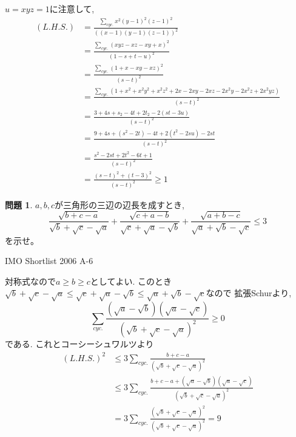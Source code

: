 \documentclass[uplatex, a5paper]{jsarticle}
\makeatletter
\theoremstyle{definition}
\newtheorem{prob}{問題}
\renewenvironment{proof}[1][\proofname]{
  \pushQED{\qed}%
  \normalfont \topsep6\p@\@plus6\p@\relax
  \trivlist
  \item[\hskip\labelsep
    #1\@addpunct{\textbf{.}}]\ignorespaces
}{%
  \popQED\endtrivlist\@endpefalse
}
\providecommand{\proofname}{証明}
\def\qed{\hfill $\Box$}
\makeatother
\begin{document}
\begin{proof}
  \(u=xyz=1\)に注意して,
  \begin{align*}
    ( L.H.S.) &=  \frac{ \sum_{cyc.}x^2(y-1)^2(z-1)^2 }{\left( (x-1)(y-1)(z-1) \right) ^2 }  \\
    &=  \frac{ \sum_{cyc.} (xyz - xz - xy + x ) ^2 }{(1-s+t-u)^2}  \\
    &=  \frac{ \sum_{cyc.} ( 1+x -xy-xz)^2}{(s-t)^2}  \\
    &=  \frac{ \sum_{cyc.} (1+x^2+x^2y^2+x^2z^2+2x-2xy-2xz-2x^2y-2x^2z+2x^2yz)}{(s-t)^2}  \\
    &=  \frac{ 3+4s + s_2 -4t + 2t_2-2(st-3u) }{(s-t)^2}  \\
    &=  \frac{ 9+4s+(s^2-2t)-4t+2(t^2-2su)-2st }{(s-t)^2}  \\
    &=  \frac{ s^2 -2st + 2t^2 -6t +1}{(s-t)^2}  \\
    &=  \frac{ (s-t)^2 + (t-3)^2}{(s-t)^2} \geq 1
  \end{align*}
\end{proof}









\newpage

\begin{prob}
  \(a,b,c\)が三角形の三辺の辺長を成すとき,
  \[
  \frac{\sqrt{b+c-a}}{\sqrt{b}+\sqrt{c}-\sqrt{a}} +
  \frac{\sqrt{c+a-b}}{\sqrt{c}+\sqrt{a}-\sqrt{b}} +
  \frac{\sqrt{a+b-c}}{\sqrt{a}+\sqrt{b}-\sqrt{c}}
  \leq 3
  \]
  を示せ。
  \begin{flushright}
    IMO Shortlist 2006 A-6
  \end{flushright}
\end{prob}


\begin{proof}
  対称式なので\(a \geq b \geq c\)としてよい.
  このとき\(\sqrt{b}+\sqrt{c}-\sqrt{a} \leq \sqrt{c}+\sqrt{a}-\sqrt{b} \leq \sqrt{a}+\sqrt{b}-\sqrt{c}\)なので
  拡張Schurより,
  \[
  \sum_{cyc.} \frac{(\sqrt{a} - \sqrt{b})(\sqrt{a}-\sqrt{c})}{(\sqrt{b}+\sqrt{c}-\sqrt{a})^2} \geq 0
  \]
  である. これとコーシーシュワルツより
  \begin{align*}
    (L.H.S.)^2 &\leq 3 \sum_{cyc.} \frac{b+c-a}{(\sqrt{b}+\sqrt{c}-\sqrt{a})^2}   \\
    &\leq 3 \sum_{cyc.} \frac{b+c-a + (\sqrt{a} - \sqrt{b})(\sqrt{a}-\sqrt{c})}{(\sqrt{b}+\sqrt{c}-\sqrt{a})^2} \\
    &= 3 \sum_{cyc.} \frac{(\sqrt{b} + \sqrt{c} - \sqrt{a})^2}{(\sqrt{b}+\sqrt{c}-\sqrt{a})^2}  = 9
  \end{align*}
\end{proof}
\end{document}

